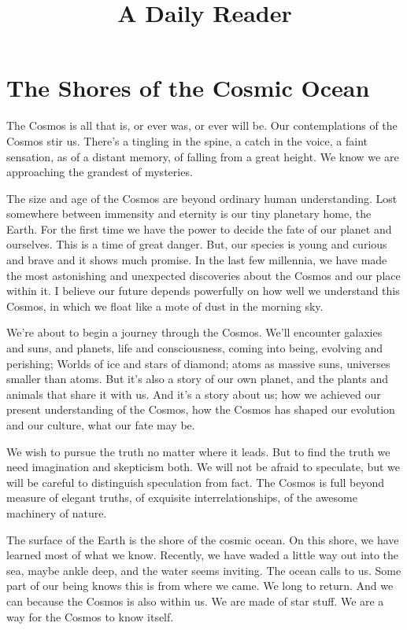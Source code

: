 \documentclass[letterpaper,9pt]{book}
\title{A Daily Reader}
\begin{document}
\maketitle

\chapter{The Shores of the Cosmic Ocean}

The Cosmos is all that is, or ever was, or ever will be. Our contemplations of the Cosmos stir us. There's a tingling in the spine, a catch in the voice, a faint sensation, as of a distant memory, of falling from a great height. We know we are approaching the grandest of mysteries.

The size and age of the Cosmos are beyond ordinary human understanding. Lost somewhere between immensity and eternity is our tiny planetary home, the Earth. For the first time we have the power to decide the fate of our planet and ourselves. This is a time of great danger. But, our species is young and curious and brave and it shows much promise. In the last few millennia, we have made the most astonishing and unexpected discoveries about the Cosmos and our place within it. I believe our future depends powerfully on how well we understand this Cosmos, in which we float like a mote of dust in the morning sky.

We're about to begin a journey through the Cosmos. We'll encounter galaxies and suns, and planets, life and consciousness, coming into being, evolving and perishing; Worlds of ice and stars of diamond; atoms as massive suns, universes smaller than atoms. But it's also a story of our own planet, and the plants and animals that share it with us. And it's a story about us; how we achieved our present understanding of the Cosmos, how the Cosmos has shaped our evolution and our culture, what our fate may be.

We wish to pursue the truth no matter where it leads. But to find the truth we need imagination and skepticism both. We will not be afraid to speculate, but we will be careful to distinguish speculation from fact. The Cosmos is full beyond measure of elegant truths, of exquisite interrelationships, of the awesome machinery of nature.

The surface of the Earth is the shore of the cosmic ocean. On this shore, we have learned most of what we know. Recently, we have waded a little way out into the sea, maybe ankle deep, and the water seems inviting. The ocean calls to us. Some part of our being knows this is from where we came. We long to return. And we can because the Cosmos is also within us. We are made of star stuff. We are a way for the Cosmos to know itself.
\end{document}
